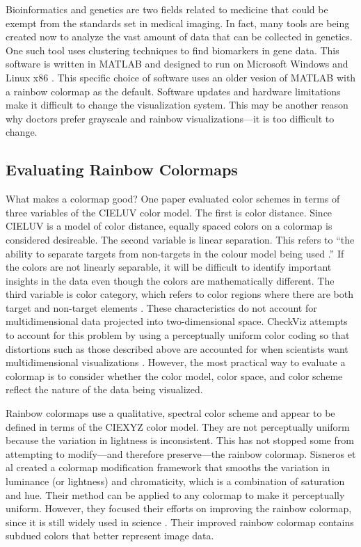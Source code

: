 \documentclass[journal,12pt]{IEEEtran}
\begin{document}
Bioinformatics and genetics are two fields related to medicine that 
could be exempt from the standards set in medical imaging. In fact, many tools
are being created now to analyze the vast amount of data that can be collected
in genetics. One such tool uses clustering techniques to find biomarkers in 
gene data. This software is written in MATLAB and designed to run on Microsoft
Windows and Linux x86 \cite{marvis}. This specific choice of software uses an
older vesion of MATLAB with a rainbow colormap as the default. 
Software updates and hardware limitations make it difficult to change 
the visualization system. This may be another reason why doctors prefer grayscale and
rainbow visualizations---it is too difficult to change.

\subsection{Evaluating Rainbow Colormaps}

What makes a colormap good?
One paper evaluated color schemes in terms of
three variables of the CIELUV color model. The first
is color distance. Since CIELUV is a model of color distance,
equally spaced colors on a colormap is considered desireable. The second variable is linear separation.
This refers to ``the ability to separate targets
from non-targets in the colour model being
used \cite{colorchoice}.'' If the
colors are not linearly separable, it
will be difficult to identify important insights in the data even though the
colors are mathematically different. The third variable
is color category, which refers to color regions where
there are both target and non-target elements \cite{colorchoice}.
These characteristics do not account for multidimensional data projected into two-dimensional
space. CheckViz attempts to account for this problem
by using a perceptually uniform color coding so that
distortions such as those described above are accounted for when 
scientists want multidimensional visualizations \cite{checkviz}.
However, the most practical way to evaluate a colormap is to consider whether the color
model, color space, and color scheme reflect the nature of the data being visualized.

Rainbow colormaps use a qualitative, spectral color scheme and appear to be defined
in terms of the CIEXYZ color model. They are not perceptually uniform because
the variation in lightness is inconsistent.
This has not stopped some from attempting to modify---and therefore preserve---the
rainbow colormap.
Sisneros et al created a colormap modification framework that smooths the variation
in luminance (or lightness) and chromaticity, which is a combination of saturation
and hue. Their method can be applied to any colormap to make it perceptually uniform.
However, they focused their efforts on improving the rainbow colormap, since it is still widely
used in science \cite{chasingrainbows}. Their improved rainbow colormap contains subdued colors that better
represent image data. 
\end{document}
